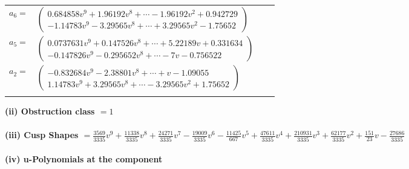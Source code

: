 \documentclass[1p]{elsarticle_modified}
\theoremstyle{definition}
\begin{document}
\begin{tabular}{m{7pt} m{180pt} m{7pt} m{180pt} }
\flushright $a_{6}=$&$\begin{pmatrix}0.684858 v^{9}+1.96192 v^{8}+\cdots-1.96192 v^{2}+0.942729\\-1.14783 v^{9}-3.29565 v^{8}+\cdots+3.29565 v^{2}-1.75652\end{pmatrix}$ \\
\flushright $a_{5}=$&$\begin{pmatrix}0.0737631 v^{9}+0.147526 v^{8}+\cdots+5.22189 v+0.331634\\-0.147826 v^{9}-0.295652 v^{8}+\cdots-7 v-0.756522\end{pmatrix}$ \\
\flushright $a_{2}=$&$\begin{pmatrix}-0.832684 v^{9}-2.38801 v^{8}+\cdots+v-1.09055\\1.14783 v^{9}+3.29565 v^{8}+\cdots-3.29565 v^{2}+1.75652\end{pmatrix}$\\&\end{tabular}
\flushleft \textbf{(ii) Obstruction class $= 1$}\\~\\
\flushleft \textbf{(iii) Cusp Shapes $= \frac{3569}{3335} v^9+\frac{11338}{3335} v^8+\frac{24271}{3335} v^7-\frac{19009}{3335} v^6-\frac{11425}{667} v^5+\frac{47611}{3335} v^4+\frac{210931}{3335} v^3+\frac{62177}{3335} v^2+\frac{151}{23} v-\frac{27686}{3335}$}\\~\\
\newpage\renewcommand{\arraystretch}{1}
\flushleft \textbf{(iv) u-Polynomials at the component}\newline \\
\end{document}
